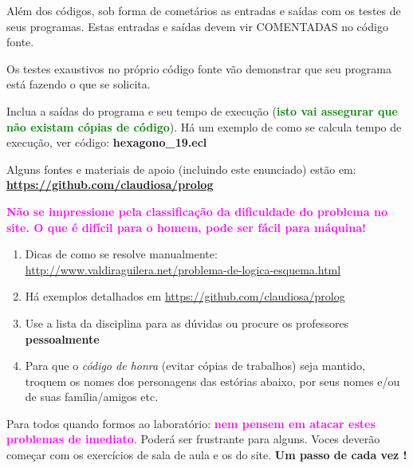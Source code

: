 \documentclass[a4paper,12pt]{article}
\begin{document}
\begin{flushleft}
\vspace{0.5cm}
 Além dos códigos, sob forma de cometários as entradas e saídas com os testes de seus programas. Estas
entradas e saídas devem vir COMENTADAS no código fonte.

\vspace{0.5cm}
 Os testes exaustivos no próprio código fonte vão demonstrar que seu programa está fazendo o que se solicita.

\vspace{0.5cm}
 Inclua a saídas do programa e seu tempo de execução (\textbf{\textcolor{green}{isto vai assegurar que não existam cópias de código}}). Há um exemplo de como se calcula tempo de execução, ver código: \textbf{hexagono\_19.ecl}

\vspace{0.5cm}
 Alguns fontes e materiais de apoio (incluindo este enunciado) estão em: \textbf{\url{https://github.com/claudiosa/prolog}} 

\vspace{0.5cm}
 \textbf{\textcolor{magenta}{Não se impressione pela classificação da dificuldade do problema no site. O que é difícil para o homem, pode ser fácil para máquina!}}

\end{flushleft}

\begin{enumerate}
\setlength\itemsep{0.1cm}
\item Dicas de como se resolve manualmente:\\
\url{http://www.valdiraguilera.net/problema-de-logica-esquema.html}

\item Há exemplos detalhados em  \url{https://github.com/claudiosa/prolog}

\item Use a lista da disciplina para as dúvidas ou procure os professores \textbf{pessoalmente}

\item Para que o \textit{código de honra} (evitar cópias de trabalhos) seja mantido, troquem os nomes dos personagens das estórias abaixo, por seus nomes e/ou de suas família/amigos etc. 

\end{enumerate}

\newpage

\begin{center}

\vskip 2cm
{\Large
Para todos quando formos ao laboratório: \textbf{\textcolor{magenta}{nem pensem em atacar estes problemas de imediato}}. Poderá ser frustrante para alguns. Voces deverão começar com os exercícios de sala de aula e os do site. \textbf{Um passo de cada vez !}
}
\vskip 2cm
\end{center}
\end{document}
